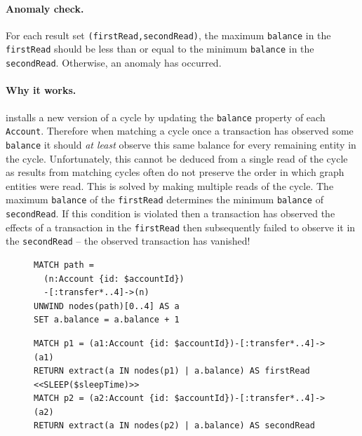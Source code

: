 \paragraph{Anomaly check.}
For each  result set \texttt{(firstRead,secondRead)},
the maximum \texttt{balance} in the \texttt{firstRead} should be less than or
equal to the minimum \texttt{balance} in the \texttt{secondRead}. Otherwise, an
 anomaly has occurred.

\paragraph{Why it works.}
 installs a new version of a cycle by updating the
\texttt{balance} property of each \texttt{Account}. Therefore when matching a
cycle once a transaction has observed some \texttt{balance} it should
\emph{at least} observe this same balance for every remaining entity in the cycle.
Unfortunately, this cannot be deduced from a single read of the cycle as results
from matching cycles often do not preserve the order in which graph entities
were read. This is solved by making multiple reads of the cycle. The maximum
\texttt{balance} of the \texttt{firstRead} determines the minimum
\texttt{balance} of \texttt{secondRead}. If this condition is violated then a
transaction has observed the effects of a transaction in the \texttt{firstRead}
then subsequently failed to observe it in the \texttt{secondRead} -- the
observed transaction has vanished!

\begin{figure}[htb]
  \centering
  \begin{minipage}{0.33\linewidth}
    \begin{lstlisting}[language=cypher,label=fig:otvfr1,caption=\tx{OTV/FR $T_\mathrm{W}$}.]
MATCH path = 
  (n:Account {id: $accountId})
  -[:transfer*..4]->(n)
UNWIND nodes(path)[0..4] AS a
SET a.balance = a.balance + 1
\end{lstlisting}
  \end{minipage}
  \quad
  \begin{minipage}{0.60\linewidth}
    \begin{lstlisting}[language=cypher,label=fig:otvfr2,caption=\tx{OTV/FR $T_\mathrm{R}$}.]
MATCH p1 = (a1:Account {id: $accountId})-[:transfer*..4]->(a1)
RETURN extract(a IN nodes(p1) | a.balance) AS firstRead
<<SLEEP($sleepTime)>>
MATCH p2 = (a2:Account {id: $accountId})-[:transfer*..4]->(a2)
RETURN extract(a IN nodes(p2) | a.balance) AS secondRead
\end{lstlisting}
  \end{minipage}
\end{figure}


